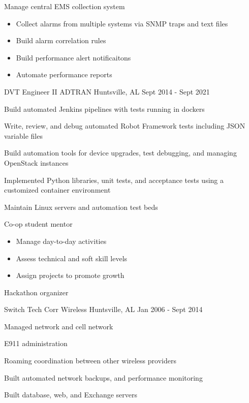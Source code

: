 \begin{cventries}
{\begin{cvitems}
\begin{itemize}
            \end{itemize}
        \item {Manage central EMS collection system}
            \begin{itemize}
                \item {Collect alarms from multiple systems via SNMP traps and text files}
                \item {Build alarm correlation rules}
                \item {Build performance alert notificaitons}
                \item {Automate performance reports}
            \end{itemize}
      \end{cvitems}
    }

  \cventry
    {DVT Engineer II} %
    {ADTRAN} %
    {Huntsville, AL} %
    {Sept 2014 - Sept 2021} %
    {
      \begin{cvitems} %
        \item {Build automated Jenkins pipelines with tests running in dockers}
        \item {Write, review, and debug automated Robot Framework tests including JSON variable files}
        \item {Build automation tools for device upgrades, test debugging, and managing OpenStack instances}
        \item {Implemented Python libraries, unit tests, and acceptance tests using a customized container environment}
        \item {Maintain Linux servers and automation test beds}
        \item {Co-op student mentor}
            \begin{itemize}
                \item {Manage day-to-day activities}
                \item {Assess technical and soft skill levels}
                \item {Assign projects to promote growth}
            \end{itemize}
        \item {Hackathon organizer}
      \end{cvitems}
    }

  \cventry
    {Switch Tech} %
    {Corr Wireless} %
    {Huntsville, AL} %
    {Jan 2006 - Sept 2014} %
    {
      \begin{cvitems} %
        \item {Managed network and cell network}
        \item {E911 administration}
        \item {Roaming coordination between other wireless providers}
        \item {Built automated network backups, and performance monitoring}
        \item {Built database, web, and Exchange servers}
      \end{cvitems}
    }

\end{cventries}
